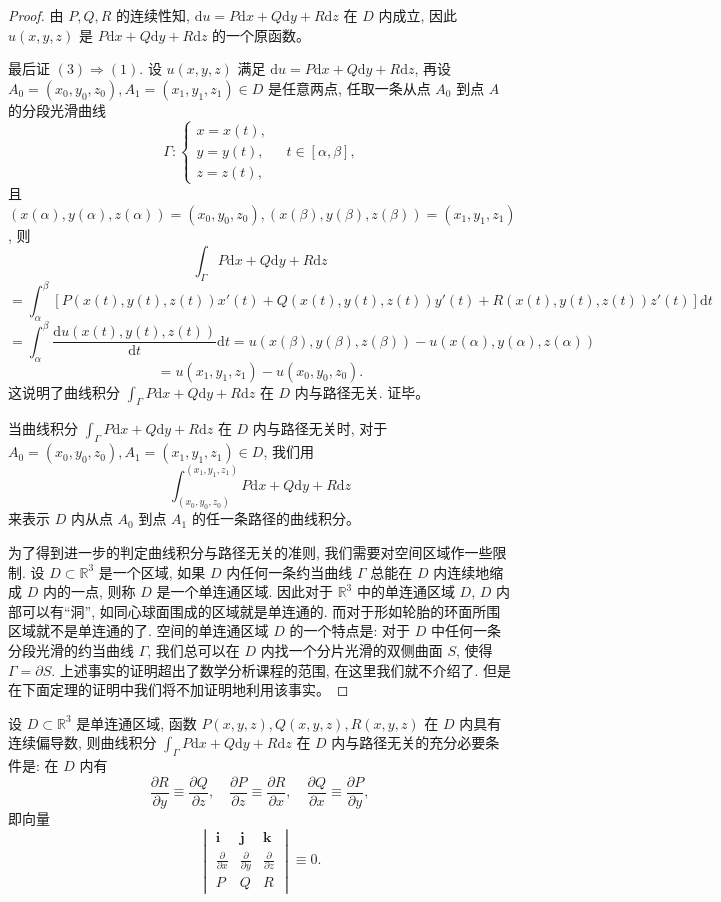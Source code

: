 \documentclass[UTF8,12pt,a4paper,fontset=fandol]{ctexart}
\begin{document}
\begin{proof}
由 $P,Q,R$ 的连续性知, $\mathrm du=P\mathrm dx+Q\mathrm dy+R\mathrm dz$ 在 $D$ 内成立, 因此 $u(x,y,z)$ 是 $P\mathrm dx+Q\mathrm dy+R\mathrm dz$ 的一个原函数。

最后证 $(3)\Rightarrow(1)$. 设 $u(x,y,z)$ 满足 $\mathrm du=P\mathrm dx+Q\mathrm dy+R\mathrm dz$, 再设 $A_0=(x_0,y_0,z_0),A_1=(x_1,y_1,z_1)\in D$ 是任意两点, 任取一条从点 $A_0$ 到点 $A$ 的分段光滑曲线
\[
  \Gamma:\begin{cases}
    x=x(t),\\
    y=y(t),\\
    z=z(t),
  \end{cases}\quad t\in[\alpha,\beta],
\]
且 $(x(\alpha),y(\alpha),z(\alpha))=(x_0,y_0,z_0),(x(\beta),y(\beta),z(\beta))=(x_1,y_1,z_1)$, 则
\[
  \int_\Gamma P\mathrm dx+Q\mathrm dy+R\mathrm dz
\]
\[
  =\int_\alpha^\beta
  [P(x(t),y(t),z(t))x'(t)+Q(x(t),y(t),z(t))y'(t)
  +R(x(t),y(t),z(t))z'(t)]\mathrm dt
\]
\[
  =\int_\alpha^\beta\frac{\mathrm du(x(t),y(t),z(t))}{\mathrm dt}\mathrm dt
  =u(x(\beta),y(\beta),z(\beta))-u(x(\alpha),y(\alpha),z(\alpha))
\]
\[
  =u(x_1,y_1,z_1)-u(x_0,y_0,z_0).
\]
这说明了曲线积分 $\int_\Gamma P\mathrm dx+Q\mathrm dy+R\mathrm dz$ 在 $D$ 内与路径无关. 证毕。

当曲线积分 $\int_\Gamma P\mathrm dx+Q\mathrm dy+R\mathrm dz$ 在 $D$ 内与路径无关时, 对于 $A_0=(x_0,y_0,z_0),A_1=(x_1,y_1,z_1)\in D$, 我们用
\[
  \int_{(x_0,y_0,z_0)}^{(x_1,y_1,z_1)}P\mathrm dx+Q\mathrm dy+R\mathrm dz
\]
来表示 $D$ 内从点 $A_0$ 到点 $A_1$ 的任一条路径的曲线积分。

为了得到进一步的判定曲线积分与路径无关的准则, 我们需要对空间区域作一些限制. 设 $D\subset\mathbb R^3$ 是一个区域, 如果 $D$ 内任何一条约当曲线 $\Gamma$ 总能在 $D$ 内连续地缩成 $D$ 内的一点, 则称 $D$ 是一个单连通区域. 因此对于 $\mathbb R^3$ 中的单连通区域 $D$, $D$ 内部可以有“洞”, 如同心球面围成的区域就是单连通的. 而对于形如轮胎的环面所围区域就不是单连通的了. 空间的单连通区域 $D$ 的一个特点是: 对于 $D$ 中任何一条分段光滑的约当曲线 $\Gamma$, 我们总可以在 $D$ 内找一个分片光滑的双侧曲面 $S$, 使得 $\Gamma=\partial S$. 上述事实的证明超出了数学分析课程的范围, 在这里我们就不介绍了. 但是在下面定理的证明中我们将不加证明地利用该事实。

\end{proof}
\begin{theorem}\label{course-theorem-16-7-2}\quad 设 $D\subset\mathbb R^3$ 是单连通区域, 函数 $P(x,y,z),Q(x,y,z),R(x,y,z)$ 在 $D$ 内具有连续偏导数, 则曲线积分 $\int_\Gamma P\mathrm dx+Q\mathrm dy+R\mathrm dz$ 在 $D$ 内与路径无关的充分必要条件是: 在 $D$ 内有
\[
  \frac{\partial R}{\partial y}\equiv\frac{\partial Q}{\partial z},
  \quad
  \frac{\partial P}{\partial z}\equiv\frac{\partial R}{\partial x},
  \quad
  \frac{\partial Q}{\partial x}\equiv\frac{\partial P}{\partial y},
\]
即向量
\[
  \begin{vmatrix}
    \boldsymbol i&\boldsymbol j&\boldsymbol k\\
    \frac{\partial}{\partial x}&\frac{\partial}{\partial y}&\frac{\partial}{\partial z}\\
    P&Q&R
  \end{vmatrix}
  \equiv0.
\]

\end{theorem}
\end{document}
